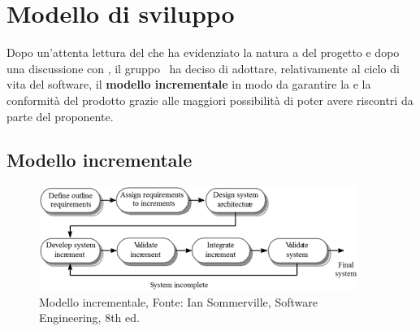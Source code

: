 \section{Modello di sviluppo}
\label{modello_di_sviluppo}
Dopo un'attenta lettura del  che ha evidenziato la natura a  del progetto e dopo una discussione con \Proponente, il gruppo \Gruppo\ ha deciso di adottare, relativamente al ciclo di vita del software, il \textbf{modello incrementale} in modo da garantire la  e la conformità del prodotto grazie alle maggiori possibilità di poter avere riscontri da parte del proponente. 

\subsection{Modello incrementale}
\begin{figure}[ht]
    \centering
    \includegraphics[scale=0.8]{Immagini/ModelloIncrementale.png}
    \caption{Modello incrementale, Fonte: Ian Sommerville, Software Engineering, 8th ed.}
    \label{fig:modello_incrementale}
\end{figure}

